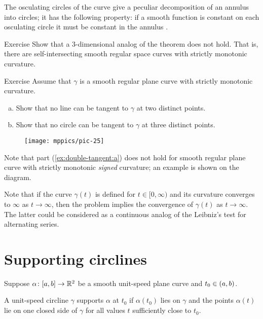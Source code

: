 The osculating circles of the curve give a peculiar decomposition of an annulus into circles; it has the following property: if a smooth function is constant on each osculating circle it must be constant in the annulus \cite[see][Lecture 10]{fuchs-tabachnikov}.

\begin{thm}{Exercise}
Show that a 3-dimensional analog of the theorem does not hold.
That is, there are self-intersecting smooth regular space curves with strictly monotonic curvature.
\end{thm}

\begin{thm}{Exercise}\label{ex:double-tangent}
Assume that $\gamma$ is a smooth regular plane curve with strictly monotonic curvature.
\begin{enumerate}[(a)]
\item\label{ex:double-tangent:a}Show that no line can be tangent to $\gamma$ at two distinct points.
\item Show that no circle can be tangent to $\gamma$ at three distinct points. 
\end{enumerate}
\end{thm} %

\begin{wrapfigure}{r}{35 mm}
\vskip-0mm
\centering
\texttt{[image: mppics/pic-25]}
\vskip0mm
\end{wrapfigure}

Note that part (\ref{ex:double-tangent:a}) does not hold for smooth regular plane curve with strictly monotonic \emph{signed} curvature; an example is shown on the diagram.

Note that if the curve $\gamma(t)$ is defined for $t\in[0,\infty)$ and its curvature converges to $\infty$ as $t\to \infty$, 
then the problem implies the convergence of $\gamma(t)$ as $t\to\infty$.
The latter could be considered as a continuous analog of the Leibniz's test for alternating series.



\section{Supporting circlines}

Suppose $\alpha\colon[a,b]\to\mathbb{R}^2$ be a smooth unit-speed plane curve and $t_0\z\in(a,b)$.

A unit-speed circline $\gamma$ supports $\alpha$ at $t_0$ if $\alpha(t_0)$ lies on $\gamma$
and the points $\alpha(t)$ lie on one closed side of $\gamma$ for all values $t$ sufficiently close to $t_0$.

